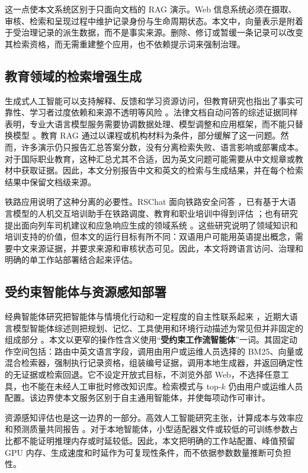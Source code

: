 这一点使本文系统区别于只面向文档的 RAG 演示。Web 信息系统必须在摄取、审核、检索和呈现过程中维护记录身份与生命周期状态。本文中，向量表示是附着于受治理记录的派生数据，而不是事实来源。删除、修订或暂缓一条记录可以改变其检索资格，而无需重建整个应用，也不依赖提示词来强制治理。

\subsection{教育领域的检索增强生成}

生成式人工智能可以支持解释、反馈和学习资源访问，但教育研究也指出了事实可靠性、学习者过度依赖和来源不透明等风险 \citep{kasneci2023chatgpt,unesco2023guidance}。法律文档自动问答的综述证据同样表明，专业大语言模型服务需要协调数据处理、模型调整和应用框架，而不能只替换模型 \citep{yang2024legalqa}。教育 RAG 通过以课程或机构材料为条件，部分缓解了这一问题。然而，许多演示仍只报告汇总答案分数，没有分离检索失败、语言影响或部署成本。对于国际职业教育，这种汇总尤其不合适，因为英文问题可能需要从中文规章或教材中获取证据。因此，本文分别报告中文和英文的检索与生成结果，并在每个检索结果中保留文档级来源。

铁路应用说明了这种分离的必要性。RSChat 面向铁路安全问答 \citep{li2024rschat}，已有基于大语言模型的人机交互培训助手在铁路调度、教育和职业培训中得到评估 \citep{li2025training}；也有研究提出面向列车司机建议和应急响应生成的领域系统 \citep{luo2025driver,huang2026emergency}。这些研究说明了领域知识和培训支持的价值，但本文的运行目标有所不同：双语用户可能用英语提出概念，需要中文来源证据，并要求来源和审核状态可见。因此，本文将跨语言访问、治理和明确的单工作站部署结合起来评估。

\subsection{受约束智能体与资源感知部署}

经典智能体研究把智能体与情境化行动和一定程度的自主性联系起来 \citep{wooldridge1995agents}，近期大语言模型智能体综述则把规划、记忆、工具使用和环境行动描述为常见但并非固定的组成部分 \citep{xi2025agents}。本文以更窄的操作性含义使用“\textbf{受约束工作流智能体}”一词。其固定动作空间包括：路由中英文语言字段，调用由用户或运维人员选择的 BM25、向量或混合检索器，强制执行记录资格，组装编号证据，调用本地生成器，并返回确定性的无证据或检索回退。它不设定开放式目标，不浏览外部 Web，不选择任意工具，也不能在未经人工审批时修改知识库。检索模式与 top-$k$ 仍由用户或运维人员配置。该边界使本文服务区别于自主通用智能体，并使每项动作可审计。

资源感知评估也是这一边界的一部分。高效人工智能研究主张，计算成本与效率应和预测质量共同报告 \citep{schwartz2020green}。对于本地智能体，小型适配器文件或较低的可训练参数占比都不能证明推理内存或时延较低。因此，本文把明确的工作站配置、峰值预留 GPU 内存、生成速度和时延作为可复现性条件，而不依据参数数量推断可负担性。

